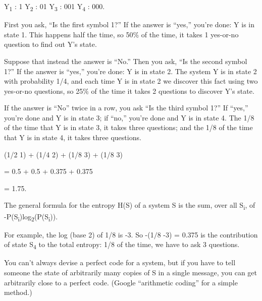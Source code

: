 {\centering
 Y\textsubscript{1} : 1\newline
 Y\textsubscript{2} : 01\newline
 Y\textsubscript{3} : 001\newline
 Y\textsubscript{4} : 000.
\par}


\bigskip

{
 First you ask, ``Is the first symbol
1?'' If the answer is
``yes,'' you're
done: Y is in state 1. This happens half the time, so 50\% of the time,
it takes 1 yes-or-no question to find out Y's state.}

{
 Suppose that instead the answer is
``No.'' Then you ask,
``Is the second symbol 1?'' If the
answer is ``yes,''
you're done: Y is in state 2. The system Y is in state
2 with probability 1/4, and each time Y is in state 2 we discover this
fact using two yes-or-no questions, so 25\% of the time it takes 2
questions to discover Y's state.}

{
 If the answer is ``No'' twice
in a row, you ask ``Is the third symbol
1?'' If ``yes,''
you're done and Y is in state 3; if
``no,'' you're done
and Y is in state 4. The 1/8 of the time that Y is in state 3, it takes
three questions; and the 1/8 of the time that Y is in state 4, it takes
three questions.}

{\centering
 (1/2 {\texttimes} 1) + (1/4 {\texttimes} 2) + (1/8 {\texttimes} 3)
+ (1/8 {\texttimes} 3)
\par}


\bigskip

{\centering
 = 0.5 + 0.5 + 0.375 + 0.375
\par}


\bigskip

{\centering
 = 1.75.
\par}


\bigskip

{
 The general formula for the entropy H(S) of a system S is the sum,
over all S\textsubscript{i}, of
-P(S\textsubscript{i})log\textsubscript{2}(P(S\textsubscript{i})).}

{
 For example, the log (base 2) of 1/8 is -3. So -(1$/$8
{\texttimes} -3) = 0.375 is the contribution of state
S\textsubscript{4} to the total entropy: 1/8 of the time, we have to
ask 3 questions.}

{
 You can't always devise a perfect code for a
system, but if you have to tell someone the state of arbitrarily many
copies of S in a single message, you can get arbitrarily close to a
perfect code. (Google ``arithmetic
coding'' for a simple method.)}

